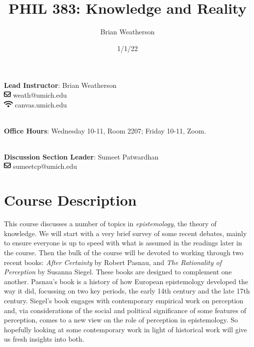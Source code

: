 \documentclass[
]{article}
\title{PHIL 383: Knowledge and Reality}
\author{Brian Weatherson}
\date{1/1/22}
\begin{document}
\maketitle
\ifdefined\Shaded\renewenvironment{Shaded}{\begin{tcolorbox}[borderline west={3pt}{0pt}{shadecolor}, sharp corners, interior hidden, enhanced, boxrule=0pt, breakable, frame hidden]}{\end{tcolorbox}}\fi

\textbf{Lead Instructor}: Brian Weatherson\\
\includegraphics[width=1em,height=1em]{figs/fa-icon-60569dd17e84ca89a2982f5f8ad92685.pdf}
weath@umich.edu\\
\includegraphics[width=1.25em,height=1em]{figs/fa-icon-0dbcc241ba7e369df73ab7fe566f4960.pdf}
canvas.umich.edu\\
\strut \\
\textbf{Office Hours}: Wednesday 10-11, Room 2207; Friday 10-11, Zoom.\\
\strut \\
\textbf{Discussion Section Leader}: Sumeet Patwardhan\\
\includegraphics[width=1em,height=1em]{figs/fa-icon-60569dd17e84ca89a2982f5f8ad92685.pdf}
sumeetcp@umich.edu

\hypertarget{course-description}{%
\section{Course Description}\label{course-description}}

This course discusses a number of topics in \emph{epistemology}, the
theory of knowledge. We will start with a very brief survey of some
recent debates, mainly to ensure everyone is up to speed with what is
assumed in the readings later in the course. Then the bulk of the course
will be devoted to working through two recent books: \emph{After
Certainty} by Robert Pasnau, and \emph{The Rationality of Perception} by
Susanna Siegel. These books are designed to complement one another.
Pasnau's book is a history of how European epistemology developed the
way it did, focussing on two key periods, the early 14th century and the
late 17th century. Siegel's book engages with contemporary empirical
work on perception and, via considerations of the social and political
significance of some features of perception, comes to a new view on the
role of perception in epistemology. So hopefully looking at some
contemporary work in light of historical work will give us fresh
insights into both.
\end{document}
